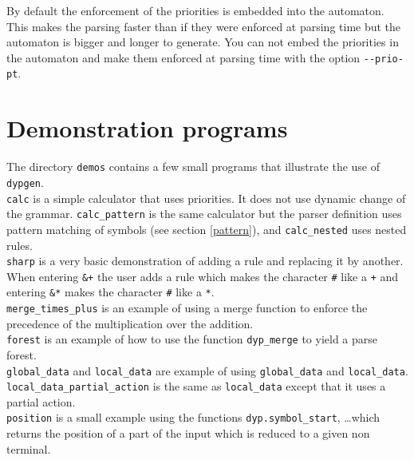 \documentclass[12pt]{article}
\begin{document}
{%

By default the enforcement of the priorities is embedded into the automaton. This makes the parsing faster than if they were enforced at parsing time but the automaton is bigger and longer to generate. You can not embed the priorities in the automaton and make them enforced at parsing time with the option \verb|--prio-pt|.

\section{Demonstration programs}

The directory \texttt{demos} contains a few small programs that illustrate the use of \texttt{dypgen}.\\

\texttt{calc} is a simple calculator that uses priorities. It does not use dynamic change of the grammar. \texttt{calc\_pattern} is the same calculator but the parser definition uses pattern matching of symbols (see section \ref{pattern}), and \verb|calc_nested| uses nested rules.\\

\texttt{sharp} is a very basic demonstration of adding a rule and replacing it by another. When entering \texttt{\&+} the user adds a rule which makes the character \texttt{\#} like a \texttt{+} and entering \texttt{\&*} makes the character \texttt{\#} like a \texttt{*}.\\

\texttt{merge\_times\_plus} is an example of using a merge function to enforce the precedence of the multiplication over the addition.\\

\texttt{forest} is an example of how to use the function \verb|dyp_merge| to yield a parse forest.\\

\verb|global_data| and \texttt{local\_data} are example of using \verb|global_data| and \texttt{local\_data}. \texttt{local\_data\_partial\_action} is the same as \texttt{local\_data} except that it uses a partial action.\\

\texttt{position} is a small example using the functions \texttt{dyp.symbol\_start}, \ldots which returns the position of a part of the input which is reduced to a given non terminal.\\

}
\end{document}
